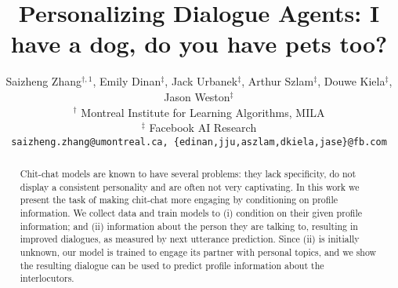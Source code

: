\documentclass[11pt,a4paper]{article}
\title{Personalizing Dialogue Agents: I have a dog, do you have pets too?}
\author{Saizheng Zhang$^{\dagger,1}$, Emily Dinan$^{\ddagger}$, Jack Urbanek$^{\ddagger}$, Arthur Szlam$^{\ddagger}$, Douwe Kiela$^{\ddagger}$, Jason Weston$^{\ddagger}$\\
   $^{\dagger}$ Montreal Institute for Learning Algorithms, MILA\\$^{\ddagger}$ Facebook AI Research\\
  {\tt saizheng.zhang@umontreal.ca, \{edinan,jju,aszlam,dkiela,jase\}@fb.com}}
\date{}
\begin{document}
\maketitle
\addtocounter{footnote}{1}
\begin{abstract}
Chit-chat models are known to have several problems: they lack specificity, do not display a consistent personality and are often not very captivating.
In this work we present the task of
 making chit-chat more engaging by conditioning on 
 profile information.
We collect data and train models to (i) condition on
their given profile information; and (ii) information about the person they are talking to,
resulting in improved dialogues, as measured by next utterance prediction.
Since (ii) is initially unknown,
our model is trained to engage its partner with personal topics, and we show the resulting dialogue can be used to predict profile information about the interlocutors.
\end{abstract}

\newif\ifarxiv
\arxivfalse


\newif\ifnoarxiv
\noarxivtrue











%
%
%
%



%

%

\newpage
\clearpage
\newpage
\clearpage
\appendix




\end{document}

